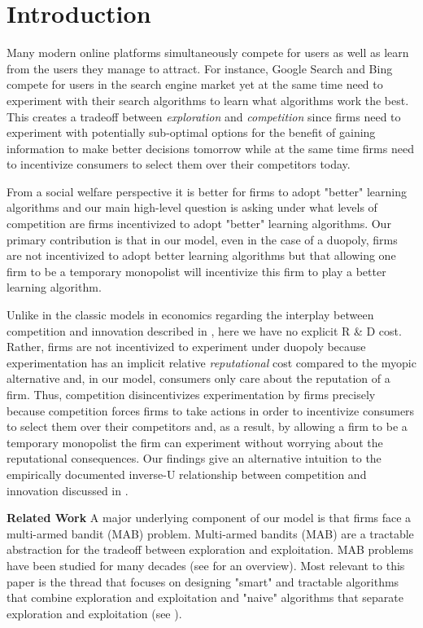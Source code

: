 \documentclass{article}
\theoremstyle{definition}
\begin{document}
\section{Introduction}\label{section:1}

Many modern online platforms simultaneously compete for users as well as learn from the users they manage to attract. For instance, Google Search and Bing compete for users in the search engine market yet at the same time need to experiment with their search algorithms to learn what algorithms work the best. This creates a tradeoff between \textit{exploration} and \textit{competition} since firms need to experiment with potentially sub-optimal options for the benefit of gaining information to make better decisions tomorrow while at the same time firms need to incentivize consumers to select them over their competitors today.

From a social welfare perspective it is better for firms to adopt "better" learning algorithms and our main high-level question is asking under what levels of competition are firms incentivized to adopt "better" learning algorithms. Our primary contribution is that in our model, even in the case of a duopoly, firms are not incentivized to adopt better learning algorithms but that allowing one firm to be a temporary monopolist will incentivize this firm to play a better learning algorithm.

Unlike in the classic models in economics regarding the interplay between competition and innovation described in \citet{barro2004economic}, here we have no explicit R \& D cost. Rather, firms are not incentivized to experiment under duopoly because experimentation has an implicit relative \textit{reputational} cost compared to the myopic alternative and, in our model, consumers only care about the reputation of a firm. Thus, competition disincentivizes experimentation by firms precisely because competition forces firms to take actions in order to incentivize consumers to select them over their competitors and, as a result, by allowing a firm to be a temporary monopolist the firm can experiment without worrying about the reputational consequences. Our findings give an alternative intuition to the empirically documented inverse-U relationship between competition and innovation discussed in \citet{aghion2005competition}.

\textbf{Related Work} A major underlying component of our model is that firms face a multi-armed bandit (MAB) problem. Multi-armed bandits (MAB) are a tractable abstraction for the tradeoff between exploration and exploitation. MAB problems have been studied for many decades (see \citet{bubeck2012regret} for an overview). Most relevant to this paper is the thread that focuses on designing "smart" and tractable algorithms that combine exploration and exploitation and "naive" algorithms that separate exploration and exploitation (see \citet{slivkins2017bandits}).
\end{document}
